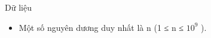 Dữ liệu
\begin{itemize}
	\item     Một số nguyên dương duy nhất là n (1 ≤ n ≤ $10^{9}$    ).   
\end{itemize}